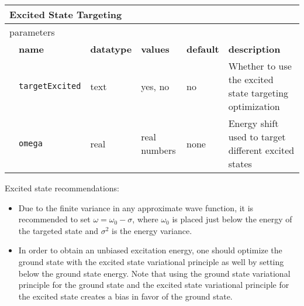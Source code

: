 \begin{table}[h]
\begin{center}
\begin{tabularx}{\textwidth}{l l l l l X }
\hline
\multicolumn{6}{l}{Excited State Targeting} \\
\hline
\multicolumn{2}{l}{parameters}  & \multicolumn{4}{l}{}\\
   &   \bfseries name     & \bfseries datatype & \bfseries values & \bfseries default   & \bfseries description \\
   &   \texttt{targetExcited} &  text   & yes, no      & no   & Whether to use the excited state targeting optimization\\
   &   \texttt{omega}         &  real   & real numbers & none & Energy shift used to target different excited states\\
  \hline
\end{tabularx}
\end{center}
\end{table}

Excited state recommendations:
\begin{itemize}
  \item Due to the finite variance in any approximate wave function, it is recommended to set $\omega=\omega_0-\sigma$, where $\omega_0$ is placed just
        below the energy of the targeted state and $\sigma^2$ is the energy variance.
  \item In order to obtain an unbiased excitation energy, one should optimize the ground state with the excited state variational principle as well by setting
         below the ground state energy.  Note that using the ground state variational principle for the ground state and the excited state variational
        principle for the excited state creates a bias in favor of the ground state. 
\end{itemize}

